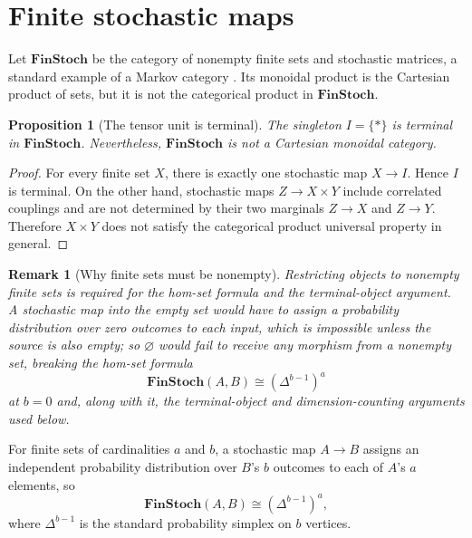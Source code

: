 \documentclass[11pt]{article}
\newtheorem{proposition}[theorem]{Proposition}
\newtheorem{remark}[theorem]{Remark}
\begin{document}
\section{Finite stochastic maps}
\label{sec:finstoch}

Let $\mathbf{FinStoch}$ be the category of nonempty finite sets and
stochastic matrices, a standard example of a Markov category
\cite{Fritz2020, ChoJacobs2019}. Its monoidal product is the Cartesian product
of sets, but it is not the categorical product in $\mathbf{FinStoch}$.

\begin{proposition}[The tensor unit is terminal]
\label{prop:finstoch-terminal}
The singleton $I=\{*\}$ is terminal in $\mathbf{FinStoch}$. Nevertheless,
$\mathbf{FinStoch}$ is not a Cartesian monoidal category.
\end{proposition}

\begin{proof}
For every finite set $X$, there is exactly one stochastic map $X\to I$.
Hence $I$ is terminal. On the other hand, stochastic maps
$Z\to X\times Y$ include correlated couplings and are not determined by
their two marginals $Z\to X$ and $Z\to Y$. Therefore $X\times Y$ does not
satisfy the categorical product universal property in general.
\end{proof}

\begin{remark}[Why finite sets must be nonempty]
\label{rem:finstoch-nonempty}
Restricting objects to nonempty finite sets is required for the hom-set
formula and the terminal-object argument. A stochastic map into the empty
set would have to assign a probability distribution over zero outcomes to
each input, which is impossible unless the source is also empty; so
$\varnothing$ would fail to receive any morphism from a nonempty set,
breaking the hom-set formula
\[
\mathbf{FinStoch}(A,B)\cong(\Delta^{b-1})^a
\]
at $b=0$ and, along with it, the terminal-object and dimension-counting
arguments used below.
\end{remark}

For finite sets of cardinalities $a$ and $b$, a stochastic map $A\to B$
assigns an independent probability distribution over $B$'s $b$ outcomes to
each of $A$'s $a$ elements, so
\[
\mathbf{FinStoch}(A,B)\cong(\Delta^{b-1})^a,
\]
where $\Delta^{b-1}$ is the standard probability simplex on $b$ vertices.
\end{document}
